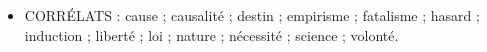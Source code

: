 \begin{itemize}[leftmargin=1cm, label=, itemsep=1pt]
\item {\footnotesize CORRÉLATS} : cause ; causalité ; destin ;  empirisme ;  fatalisme ; hasard ; induction ; liberté ; loi ; nature ; nécessité ; science ; volonté.
\end{itemize}

